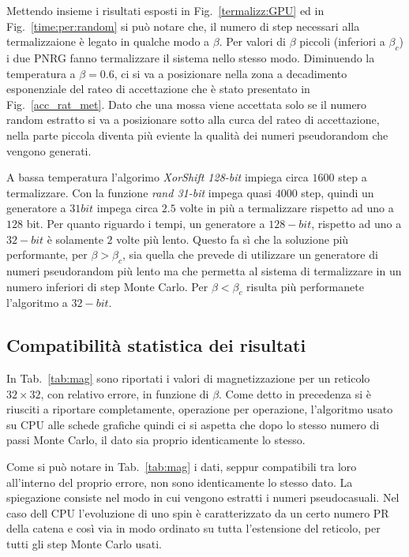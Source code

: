 \documentclass[a4paper,12pt]{article}
\begin{document}
Mettendo insieme i risultati esposti in Fig.~\ref{termalizz:GPU} ed in Fig.~\ref{time:per:random} si pu\`o notare che, il numero di step necessari alla termalizzaione \`e legato in qualche modo a $\beta$. Per valori di $\beta$ piccoli (inferiori a $\beta_c$) i due PNRG fanno termalizzare il sistema nello stesso modo. Diminuendo la temperatura a $\beta=0.6$, ci si va a posizionare nella zona a decadimento esponenziale del rateo di accettazione che \`e stato presentato in Fig.~\ref{acc_rat_met}. Dato che una mossa viene accettata solo se il numero random estratto si va a posizionare sotto alla curca del rateo di accettazione, nella parte piccola diventa pi\`u eviente la qualit\`a dei numeri pseudorandom che vengono generati.

A bassa temperatura l'algorimo \emph{XorShift 128-bit} impiega circa $1600$ step a termalizzare. Con la funzione \emph{rand 31-bit} impega quasi $4000$ step, quindi un generatore a $31bit$ impega circa $2.5$ volte in pi\`u a termalizzare rispetto ad uno a $128$ bit. Per quanto riguardo i tempi, un generatore a $128-bit$, rispetto ad uno a $32-bit$ \`e solamente $2$ volte pi\`u lento. Questo fa s\`i che la soluzione pi\`u performante, per $\beta>\beta_c$, sia quella che prevede di utilizzare un generatore di numeri pseudorandom pi\`u lento ma che permetta al sistema di termalizzare in un numero inferiori di step Monte Carlo. Per $\beta < \beta_c$ risulta pi\`u performanete l'algoritmo a $32-bit$.

\subsection{Compatibilit\`a statistica dei risultati}
In Tab.~\ref{tab:mag} sono riportati i valori di magnetizzazione per un reticolo $32\times32$, con relativo errore, in funzione di $\beta$. Come detto in precedenza si è riusciti a riportare completamente, operazione per operazione, l'algoritmo usato su CPU alle schede grafiche quindi ci si aspetta che dopo lo stesso numero di passi Monte Carlo, il dato sia proprio identicamente lo stesso. 

Come si può notare in Tab.~\ref{tab:mag} i dati, seppur compatibili tra loro all'interno del proprio errore, non sono identicamente lo stesso dato. La spiegazione consiste nel modo in cui vengono estratti i numeri pseudocasuali. Nel caso dell CPU l'evoluzione di uno spin è caratterizzato da un certo numero PR della catena e così via in modo ordinato su tutta l'estensione del reticolo, per tutti gli step Monte Carlo usati. 
\end{document}
